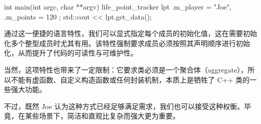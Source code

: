 \begin{cpp}
int main(int argc, char **argv) {
  life_point_tracker lpt {
    .m_player = "Joe",
    .m_points = 120
  };
  std::cout << lpt.get_data();
}
\end{cpp}

通过这一便捷的语言特性，我们可以显式指定每个成员的初始化值，这在需要初始化多个整型成员时尤其有用。该特性强制要求成员必须按照其声明顺序进行初始化，从而提升了代码的可读性与可维护性。

当然，这项特性也带来了一定限制：它要求类必须是一个聚合体（aggregate），所以不能有虚函数、自定义构造函数或任何封装机制，本质上是牺牲了 C++ 类的一些强大功能。

不过，既然 Joe 认为这种方式已经足够满足需求，我们也可以接受这种权衡。毕竟，在某些场景下，简洁和直观比复杂而强大更为重要。


